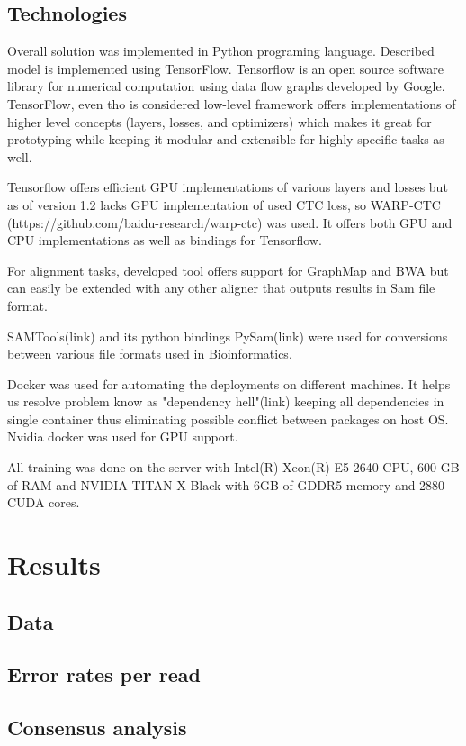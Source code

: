 \documentclass[times, utf8, diplomski, numeric, english]{fer}
\begin{document}
\section{Technologies}

Overall solution was implemented in Python programing language. Described model is implemented using TensorFlow. Tensorflow is an open source software library for numerical computation using data flow graphs developed by Google.  TensorFlow, even tho is considered low-level framework offers implementations of higher level concepts (layers, losses, and optimizers) which makes it great for prototyping while keeping it modular and extensible for highly specific tasks as well.

Tensorflow offers efficient GPU implementations of various layers and losses but as of version 1.2 lacks GPU implementation of used CTC loss, so WARP-CTC (https://github.com/baidu-research/warp-ctc) was used. It offers both GPU and CPU implementations as well as bindings for Tensorflow.

For alignment tasks, developed tool offers support for GraphMap and BWA but can easily be extended with any other aligner that outputs results in Sam file format.

SAMTools(link) and its python bindings PySam(link) were used for conversions between various file formats used in Bioinformatics.

Docker was used for automating the deployments on different machines. It helps us resolve problem know as  "dependency hell"(link)  keeping all dependencies in single container thus eliminating possible conflict between packages on host OS.
Nvidia docker was used for GPU support.

All training was done on the server with  Intel(R) Xeon(R) E5-2640 CPU, 600 GB of RAM and NVIDIA TITAN X Black with 6GB of GDDR5 memory and 2880 CUDA cores.
\chapter{Results}
\section{Data}
\section{Error rates per read}
\section{Consensus analysis}
\end{document}
